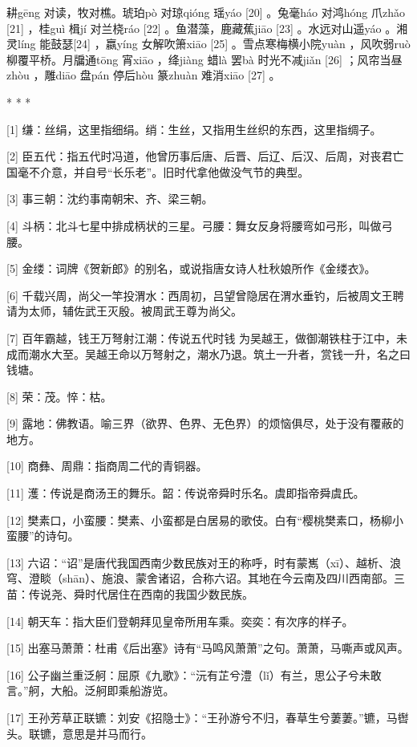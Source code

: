 \documentclass[12pt,UTF8]{ctexbook}
\begin{document}
耕gēng 对读，牧对樵。琥珀pò 对琼qióng 瑶yáo [20] 。兔毫háo 对鸿hóng 爪zhǎo [21] ，桂guì 楫jí 对兰桡ráo [22] 。鱼潜藻，鹿藏蕉jiāo [23] 。水远对山遥yáo 。湘灵líng 能鼓瑟[24] ，嬴yíng 女解吹箫xiāo [25] 。雪点寒梅横小院yuàn ，风吹弱ruò 柳覆平桥。月牖通tōng 宵xiāo ，绛jiàng 蜡là 罢bà 时光不减jiǎn [26] ；风帘当昼zhòu ，雕diāo 盘pán 停后hòu 篆zhuàn 难消xiāo [27] 。



* * *



[1] 缣：丝绢，这里指细绢。绡：生丝，又指用生丝织的东西，这里指绸子。

[2] 臣五代：指五代时冯道，他曾历事后唐、后晋、后辽、后汉、后周，对丧君亡国毫不介意，并自号“长乐老”。旧时代拿他做没气节的典型。

[3] 事三朝：沈约事南朝宋、齐、梁三朝。

[4] 斗柄：北斗七星中排成柄状的三星。弓腰：舞女反身将腰弯如弓形，叫做弓腰。

[5] 金缕：词牌《贺新郎》的别名，或说指唐女诗人杜秋娘所作《金缕衣》。

[6] 千载兴周，尚父一竿投渭水：西周初，吕望曾隐居在渭水垂钓，后被周文王聘请为太师，辅佐武王灭殷。被周武王尊为尚父。

[7] 百年霸越，钱王万弩射江潮：传说五代时钱 为吴越王，做御潮铁柱于江中，未成而潮水大至。吴越王命以万弩射之，潮水乃退。筑土一升者，赏钱一升，名之曰钱塘。

[8] 荣：茂。悴：枯。

[9] 露地：佛教语。喻三界（欲界、色界、无色界）的烦恼俱尽，处于没有覆蔽的地方。

[10] 商彝、周鼎：指商周二代的青铜器。

[11] 濩：传说是商汤王的舞乐。韶：传说帝舜时乐名。虞即指帝舜虞氏。

[12] 樊素口，小蛮腰：樊素、小蛮都是白居易的歌伎。白有“樱桃樊素口，杨柳小蛮腰”的诗句。

[13] 六诏：“诏”是唐代我国西南少数民族对王的称呼，时有蒙嶲（xī）、越析、浪穹、澄睒（shān）、施浪、蒙舍诸诏，合称六诏。其地在今云南及四川西南部。三苗：传说尧、舜时代居住在西南的我国少数民族。

[14] 朝天车：指大臣们登朝拜见皇帝所用车乘。奕奕：有次序的样子。

[15] 出塞马萧萧：杜甫《后出塞》诗有“马鸣风萧萧”之句。萧萧，马嘶声或风声。

[16] 公子幽兰重泛舸：屈原《九歌》：“沅有芷兮澧（lǐ）有兰，思公子兮未敢言。”舸，大船。泛舸即乘船游览。

[17] 王孙芳草正联镳：刘安《招隐士》：“王孙游兮不归，春草生兮萋萋。”镳，马辔头。联镳，意思是并马而行。
\end{document}

